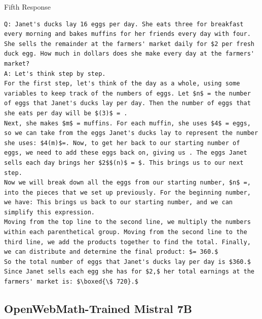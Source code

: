 \documentclass{article} %
\begin{document}
\vspace{10px}
Fifth Response
\begin{lstlisting}
Q: Janet's ducks lay 16 eggs per day. She eats three for breakfast every morning and bakes muffins for her friends every day with four. She sells the remainder at the farmers' market daily for $2 per fresh duck egg. How much in dollars does she make every day at the farmers' market?
A: Let's think step by step.
For the first step, let's think of the day as a whole, using some variables to keep track of the numbers of eggs. Let $n$ = the number of eggs that Janet's ducks lay per day. Then the number of eggs that she eats per day will be $(3)$ = .
Next, she makes $m$ = muffins. For each muffin, she uses $4$ = eggs, so we can take from the eggs Janet's ducks lay to represent the number she uses: $4(m)$=. Now, to get her back to our starting number of eggs, we need to add these eggs back on, giving us . The eggs Janet sells each day brings her $2$$(n)$ = $. This brings us to our next step.
Now we will break down all the eggs from our starting number, $n$ =, into the pieces that we set up previously. For the beginning number, we have: This brings us back to our starting number, and we can simplify this expression.
Moving from the top line to the second line, we multiply the numbers within each parenthetical group. Moving from the second line to the third line, we add the products together to find the total. Finally, we can distribute and determine the final product: $= 360.$
So the total number of eggs that Janet's ducks lay per day is $360.$ Since Janet sells each egg she has for $2,$ her total earnings at the farmers' market is: $\boxed{\$ 720}.$
\end{lstlisting}

\subsection{OpenWebMath-Trained Mistral 7B}
\end{document}
